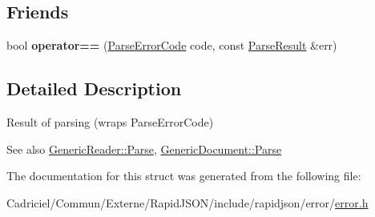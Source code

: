\subsection*{Friends}
\begin{DoxyCompactItemize}
\item 
bool {\bfseries operator==} (\hyperlink{group___r_a_p_i_d_j_s_o_n___e_r_r_o_r_s_ga8d4b32dfc45840bca189ade2bbcb6ba7}{Parse\+Error\+Code} code, const \hyperlink{struct_parse_result}{Parse\+Result} \&err)\hypertarget{struct_parse_result_a58c9982e833d1c74686506ac7449200c}{}\label{struct_parse_result_a58c9982e833d1c74686506ac7449200c}

\end{DoxyCompactItemize}


\subsection{Detailed Description}
Result of parsing (wraps Parse\+Error\+Code) 


 \begin{DoxySeeAlso}{See also}
\hyperlink{class_generic_reader_a0c450620d14ff1824e58bb7bd9b42099}{Generic\+Reader\+::\+Parse}, \hyperlink{class_generic_document_aebd4e7fddd80c1e1174837aee6d2159b}{Generic\+Document\+::\+Parse} 
\end{DoxySeeAlso}


The documentation for this struct was generated from the following file\+:\begin{DoxyCompactItemize}
\item 
Cadriciel/\+Commun/\+Externe/\+Rapid\+J\+S\+O\+N/include/rapidjson/error/\hyperlink{error_8h}{error.\+h}\end{DoxyCompactItemize}
